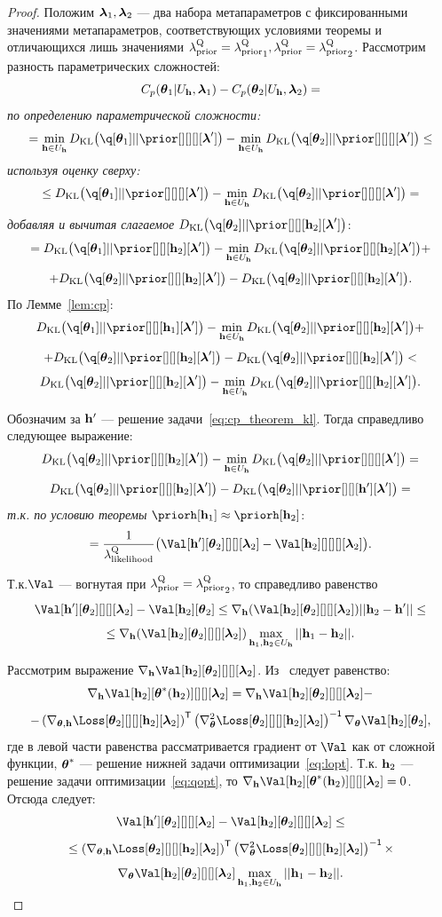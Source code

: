 \begin{proof}
Положим $\boldsymbol{\lambda}_1, \boldsymbol{\lambda}_2$ --- два набора метапараметров с фиксированными значениями метапараметров, соответствующих условиями теоремы и отличающихся лишь значениями $\lambda_\text{prior}^\text{Q} = {\lambda_\text{prior}^\text{Q}}_1, \lambda_\text{prior}^\text{Q} =  {\lambda_\text{prior}^\text{Q}}_2$.
Рассмотрим разность параметрических сложностей:
\[
    C_p(\boldsymbol{\theta}_1|U_{\mathbf{h}}, \boldsymbol{\lambda}_1) - C_p(\boldsymbol{\theta}_2|U_{\mathbf{h}}, \boldsymbol{\lambda}_2) =
\]
\textit{по определению параметрической сложности:}
\[
= \min_{\h \in \Uh} \KL{\q[\teta_1]}{\prior[][][][\lam']} -  \min_{\h \in \Uh} \KL{\q[\teta_2]}{\prior[][][][\lam']} \leq
\]
\textit{используя оценку сверху:}
\[
 \leq \KL{\q[\teta_1]}{\prior[][][][\lam']} -   \min_{\h \in \Uh} \KL{\q[\teta_2]}{\prior[][][][\lam']} = 
\]
\textit{добавляя и вычитая слагаемое }$\KL{\q[\teta_2]}{\prior[][][\h_2][\lam']}$:
\[
  = \KL{\q[\teta_1]}{\prior[][][\h_2][\lam']} -   \min_{\h \in \Uh} \KL{\q[\teta_2]}{\prior[][][\h_2][\lam']} + 
\]
\[
+  \KL{\q[\teta_2]}{\prior[][][\h_2][\lam']} -   \KL{\q[\teta_2]}{\prior[][][\h_2][\lam']}. 
\]
По Лемме~\ref{lem:cp}:
\[
   \KL{\q[\teta_1]}{\prior[][][\h_1][\lam']} -   \min_{\h \in \Uh} \KL{\q[\teta_2]}{\prior[][][\h_2][\lam']} + 
\]
\[
+  \KL{\q[\teta_2]}{\prior[][][\h_2][\lam']} -   \KL{\q[\teta_2]}{\prior[][][\h_2][\lam']} <
\]
\[
    \KL{\q[\teta_2]}{\prior[][][\h_2][\lam']} -   \min_{\h \in \Uh} \KL{\q[\teta_2]}{\prior[][][\h_2][\lam']}.
\]

Обозначим за $\mathbf{h}'$ --- решение задачи~\eqref{eq:cp_theorem_kl}.
Тогда справедливо следующее выражение:
\[
     \KL{\q[\teta_2]}{\prior[][][\h_2][\lam']} -   \min_{\h \in \Uh} \KL{\q[\teta_2]}{\prior[][][][\lam']}  = 
\]
\[
    \KL{\q[\teta_2]}{\prior[][][\h_2][\lam']} -   \KL{\q[\teta_2]}{\prior[][][\h'][\lam']} = 
\]
\textit{т.к. по условию теоремы } $\priorh[\h_1] \approx \priorh[\h_2]$:
\[
  = \frac{1}{\lamLL}\bigl(\Val[\h'][\teta_2][][][\lam_2] -  \Val[\h_2][][][][\lam_2]\bigr).
\]

Т.к.$\Val$ --- вогнутая при $\lambda_\text{prior}^\text{Q}  = {\lambda_\text{prior}^\text{Q}}_2$, то справедливо равенство
\[
 \Val[\h'][\teta_2][][][\lam_2] -  \Val[\h_2][\teta_2] \leq \nabla_{\h} (\Val[\h_2][\teta_2][][][\lam_2]) ||\h_2 - \h'||  \leq
\]
\[
\leq \nabla_{\h} (\Val[\h_2][\teta_2][][][\lam_2]) \max_{\h_1, \h_2 \in \Uh} ||\h_1 - \h_2||.
\]


Рассмотрим выражение $\nabla_{\h} \Val[\h_2][\teta_2][][][\lam_2]$. Из~\cite{hyper_hoag} следует равенство:
\[
    \nabla_{\h} \Val[\h_2][\teta^{*}(\h_2)][][][\lam_2]  = \nabla_{\h} \Val[\h_2][\teta_2][][][\lam_2] -
\]
\[
-  \left(\nabla_{\teta, \h} {\Loss[\teta_2][][][\h_2][\lam_2]}\right)^\mathsf{T} \left(\nabla_{\teta}^2 {\Loss[\teta_2][][][\h_2][\lam_2]}\right)^\mathsf{-1} \nabla_{\teta}\Val[\h_2][\teta_2],
\]
где в левой части равенства рассматривается градиент от $\Val$ как от сложной функции,  $\boldsymbol{\theta}^{*}$ --- решение нижней задачи оптимизации~\eqref{eq:lopt}.
Т.к. $\mathbf{h}_2$ --- решение задачи оптимизации~\eqref{eq:qopt}, то $\nabla_{\h} \Val[\h_2][\teta^{*}(\h_2)][][][\lam_2] = 0$.
Отсюда следует:
\[
     \Val[\h'][\teta_2][][][\lam_2] -  \Val[\h_2][\teta_2][][][\lam_2] \leq
\]
\[\leq  \left( \nabla_{\teta, \h} \Loss[\teta_2][][][\h_2][\lam_2]\right)^\mathsf{T} \left(\nabla_{\teta}^2 \Loss[\teta_2][][][\h_2][\lam_2]\right)^\mathsf{-1} \times
\]
\[
 \nabla_{\teta}\Val[\h_2][\teta_2][][][\lam_2] \max_{\h_1, \h_2 \in \Uh} ||\h_1 - \h_2||.
\]


\end{proof}
